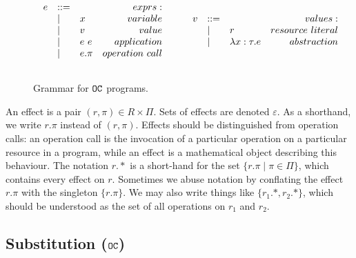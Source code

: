 \begin{figure}[h]
\vspace{-5pt}

\[
\begin{array}{lll}

\begin{array}{lllr}

e & ::= & ~ & exprs: \\
	& | & x & variable \\
	& | & v & value \\
	& | & e ~ e & application \\
	& | & e.\pi & operation~call \\
	&&\\

\end{array}

	\hspace{5ex}

\begin{array}{lllr}

v & ::= & ~ & values: \\ 
	& | & r & resource~literal \\
	& | & \lambda x: \tau.e & abstraction \\
	&&\\

\end{array}

\end{array}
\]

\vspace{-7pt}
\caption{Grammar for $\mathtt{OC}$ programs.}
\label{fig:opercalc_grammar}
\end{figure}

An effect is a pair $(r, \pi) \in R \times \Pi$. Sets of effects are denoted $\varepsilon$. As a shorthand, we write $r.\pi$ instead of $(r, \pi)$. Effects should be distinguished from operation calls: an operation call is the invocation of a particular operation on a particular resource in a program, while an effect is a mathematical object describing this behaviour. The notation $r.*$ is a short-hand for the set $\{ r.\pi \mid \pi \in \Pi \}$, which contains every effect on $r$. Sometimes we abuse notation by conflating the effect $r.\pi$ with the singleton $\{ r.\pi \}$. We may also write things like $\{ r_1.*, r_2.* \}$, which should be understood as the set of all operations on $r_1$ and $r_2$.

\subsection{Substitution ($\mathtt{OC}$)}

